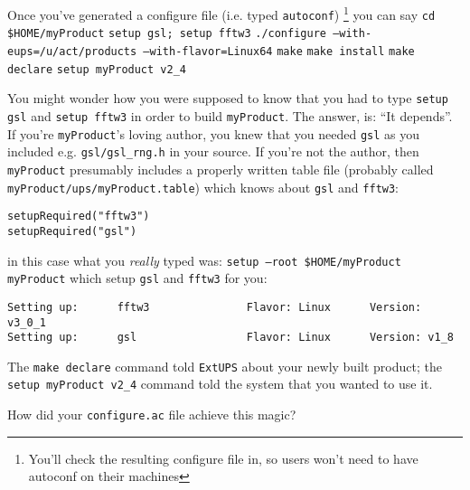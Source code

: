 \documentclass{article}
\newcommand{\code}[1]{\texttt{#1}}
\newcommand{\file}[1]{\texttt{#1}}
\newcommand{\eups}{\code{ExtUPS}}
\begin{document}
Once you've generated a configure file (i.e. typed \code{autoconf})%
\footnote{You'll check the resulting configure file in, so users won't
  need to have autoconf on their machines}
you can say\hfil\break
\code{cd \$HOME/myProduct}\hfil\break
\code{setup gsl; setup fftw3}\hfil\break
\code{./configure --with-eups=/u/act/products --with-flavor=Linux64}\hfil\break
\code{make}\hfil\break
\code{make install}\hfil\break
\code{make declare}\hfil\break
\code{setup myProduct v2\_4}\hfil\break

You might wonder how you were supposed to know that you had to type
\code{setup gsl} and \code{setup fftw3} in order to build
\code{myProduct}. The answer, is: ``It depends''.  If you're
\code{myProduct}'s loving author, you knew that you needed
\code{gsl} as you included e.g. \code{gsl/gsl\_rng.h} in your
source. If you're not the author, then \code{myProduct} presumably
includes a properly written table file (probably called
\code{myProduct/ups/myProduct.table}) which knows about
\code{gsl} and \code{fftw3}:
\begin{verbatim}
setupRequired("fftw3")
setupRequired("gsl")
\end{verbatim}
in this case what you \textit{really} typed was:\hfil\break
\code{setup --root \$HOME/myProduct myProduct}\hfil\break
which setup \code{gsl} and \code{fftw3} for you:
\begin{verbatim}
Setting up:      fftw3               Flavor: Linux      Version: v3_0_1
Setting up:      gsl                 Flavor: Linux      Version: v1_8
\end{verbatim}

The \code{make declare} command told \eups{} about your newly built
product; the \code{setup myProduct v2\_4} command told the system
that you wanted to use it.

How did your \file{configure.ac} file achieve this magic?
\end{document}
